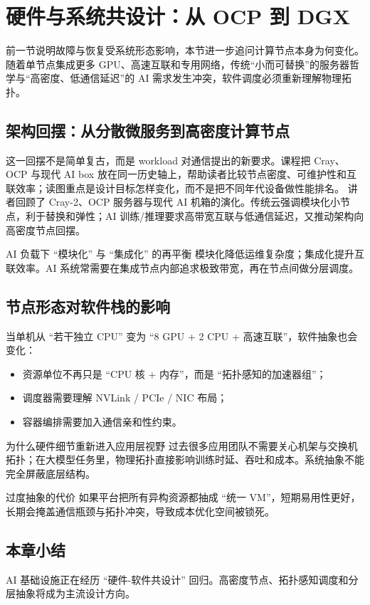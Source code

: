 \section{硬件与系统共设计：从 OCP 到 DGX}

前一节说明故障与恢复受系统形态影响，本节进一步追问计算节点本身为何变化。随着单节点集成更多 GPU、高速互联和专用网络，传统“小而可替换”的服务器哲学与“高密度、低通信延迟”的 AI 需求发生冲突，软件调度必须重新理解物理拓扑。

\subsection{架构回摆：从分散微服务到高密度计算节点}
这一回摆不是简单复古，而是 workload 对通信提出的新要求。课程把 Cray、OCP 与现代 AI box 放在同一历史轴上，帮助读者比较节点密度、可维护性和互联效率；读图重点是设计目标怎样变化，而不是把不同年代设备做性能排名。
讲者回顾了 Cray-2、OCP 服务器与现代 AI 机箱的演化。传统云强调模块化小节点，利于替换和弹性；AI 训练/推理要求高带宽互联与低通信延迟，又推动架构向高密度节点回摆。

\begin{importantbox}{AI 负载下 ``模块化'' 与 ``集成化'' 的再平衡}
模块化降低运维复杂度；集成化提升互联效率。AI 系统常需要在集成节点内部追求极致带宽，再在节点间做分层调度。
\end{importantbox}

\subsection{节点形态对软件栈的影响}
当单机从 ``若干独立 CPU'' 变为 ``8 GPU + 2 CPU + 高速互联''，软件抽象也会变化：
\begin{itemize}
    \item 资源单位不再只是 ``CPU 核 + 内存''，而是 ``拓扑感知的加速器组''；
    \item 调度器需要理解 NVLink / PCIe / NIC 布局；
    \item 容器编排需要加入通信亲和性约束。
\end{itemize}

\begin{knowledgebox}{为什么硬件细节重新进入应用层视野}
过去很多应用团队不需要关心机架与交换机拓扑；在大模型任务里，物理拓扑直接影响训练时延、吞吐和成本。系统抽象不能完全屏蔽底层结构。
\end{knowledgebox}

\begin{warningbox}{过度抽象的代价}
如果平台把所有异构资源都抽成 ``统一 VM''，短期易用性更好，长期会掩盖通信瓶颈与拓扑冲突，导致成本优化空间被锁死。
\end{warningbox}

\subsection{本章小结}
AI 基础设施正在经历 ``硬件-软件共设计'' 回归。高密度节点、拓扑感知调度和分层抽象将成为主流设计方向。

